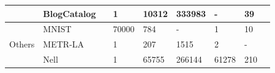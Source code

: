 \begin{table}[htbp]
\begin{tabular}{l l l l l l l l l }
            \multicolumn{1}{l|}{}   & BlogCatalog                     &               \cite{tang2009relational}                             & 1                                       & 10312           & 333983   &   -         & 39        &     \cite{dai2018learning,liu2018geniepath,wang2016sdne,yu2018learning}                                                    \\ \hline
			\multicolumn{1}{l|}{\multirow{3}{*}{Others}} & MNIST                   &  \cite{lecun1998gradient}     &  70000                                                                    &       784          &     -     &       1     &     10      &             \cite{bruna2013spectral,levie2017cayleynets,defferrard2016convolutional,monti2017geometric,simonovsky2017dynamic}                                            \\ \cline{2-9} 
			\multicolumn{1}{l|}{} & METR-LA                    &      \cite{jagadish2014big}  &       1                                                                    &        207         &     1515     &     2       &   -        &   \cite{zhang2018gaan,li2018diffusion,wu2019graph}                                                      \\ \cline{2-9} 
			\multicolumn{1}{l|}{}                                   & Nell                            &   \cite{carlson2010toward}     &        1                                                                   & 65755           & 266144   & 61278      & 210       &    \cite{kipf2017semi,zhuang2018dual,chen2018stochastic}                                                   \\
			\hline
			\bottomrule
		\end{tabular}
	\end{table}
	
